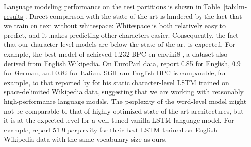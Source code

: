 Language modeling performance on the test partitions is shown in
Table~\ref{tab:lm-results}.  Direct comparison with the state of the art is hindered by
the fact that we train on text without whitespace: Whitespace is both
relatively easy to predict, and it makes predicting other
characters easier. Consequently, the fact that our character-level models are
below the state of the art is expected. For example, the best model of
 achieved 1.232 BPC on enwiki8
\cite{hutter2018}, a dataset also derived from English
Wikipedia. %
On EuroParl data,  report 0.85 for English,
0.9 for German, and 0.82 for Italian. Still, our English BPC is
comparable, for example, to that reported by  for
his static character-level LSTM trained on space-delimited Wikipedia data,
suggesting that we are working with reasonably high-performance language
models. The perplexity of the word-level model might not be comparable to
that of highly-optimized state-of-the-art architectures, but it is at the
expected level for a well-tuned vanilla LSTM language model. For
example,  report 51.9 perplexity for
their best LSTM trained on English Wikipedia data with the same vocabulary
size as ours.

